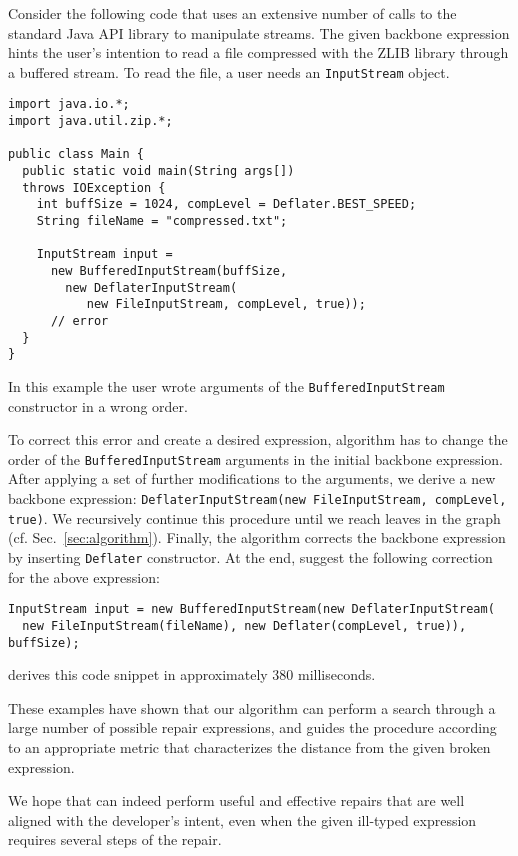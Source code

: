 Consider the following code that uses an extensive number of calls to the standard Java API library to manipulate streams. The given backbone expression hints the user's intention to read a file compressed with the ZLIB library through a buffered stream.
To read the file, a user needs an \lstinline{InputStream} object.
\begin{lstlisting}
import java.io.*;
import java.util.zip.*;

public class Main {
  public static void main(String args[]) 
  throws IOException {
    int buffSize = 1024, compLevel = Deflater.BEST_SPEED;
    String fileName = "compressed.txt";
    
    InputStream input = 
      new BufferedInputStream(buffSize,
        new DeflaterInputStream(
           new FileInputStream, compLevel, true)); 
      // error
  }
}
\end{lstlisting}

In this example the user wrote arguments of 
the \lstinline{BufferedInputStream} constructor in a wrong order.

To correct this error and create a desired expression, 
\ourTool algorithm has to change the order of
the \lstinline{BufferedInputStream} arguments in the initial backbone expression.
After applying a set of further modifications to the arguments, we derive 
a new backbone expression: 
\lstinline{DeflaterInputStream(new FileInputStream, compLevel, true)}.
We recursively continue this procedure until we reach leaves in the
\ourTool graph (cf. Sec.~\ref{sec:algorithm}). Finally, the algorithm corrects the backbone expression
by inserting \lstinline{Deflater} constructor. At the end, \ourTool suggest the following correction for the above expression:
\begin{lstlisting}    
InputStream input = new BufferedInputStream(new DeflaterInputStream(
  new FileInputStream(fileName), new Deflater(compLevel, true)), buffSize);
\end{lstlisting}
\ourTool derives this code snippet in approximately 380 milliseconds.

These examples have shown that our algorithm can perform a search through a large number of
possible repair expressions, and guides the procedure according to an appropriate metric
that characterizes the distance from the given broken expression.

We hope that \ourTool can indeed perform useful and effective repairs that are well aligned with the developer's intent, even when the given ill-typed expression requires several steps of the repair.  

